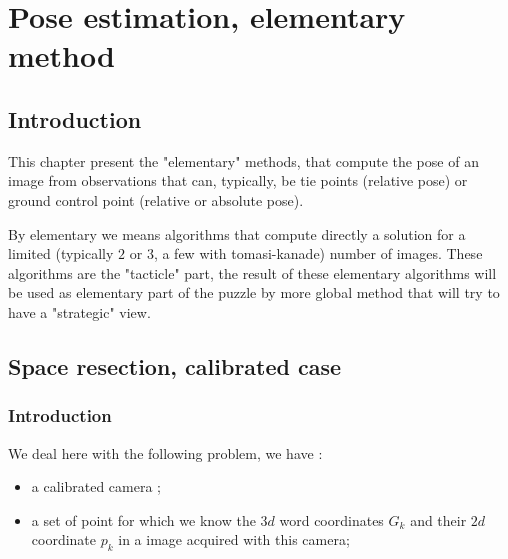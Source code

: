 
\chapter{Pose estimation, elementary method}



\section{Introduction}

This chapter present the "elementary" methods, that compute the pose of an image
from observations that can, typically, be tie points (relative pose) or 
ground control point (relative or absolute pose).

By elementary we means algorithms that compute directly a solution for a limited
(typically $2$ or $3$, a few with tomasi-kanade) number of images. These algorithms
are the "tacticle" part, the result of these elementary algorithms will be used as
elementary part of the puzzle by more global method that will try to have a "strategic"  view.



\section{Space resection, calibrated case}

\label{SR_Cal}

\subsection{Introduction}

We deal here with the following problem,  we have :

\begin{itemize}
   \item a calibrated camera ;
   \item a set of point for which we know the  $3d$ word coordinates $G_k$ and their 
        $2d$ coordinate $p_k$ in a image acquired with this camera;
\end{itemize}


